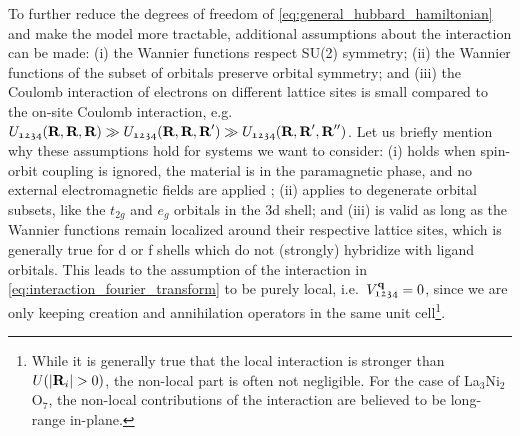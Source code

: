 \documentclass[../../main.tex]{subfiles}
\begin{document}
To further reduce the degrees of freedom of \eqref{eq:general_hubbard_hamiltonian} and make the model more tractable, additional assumptions about the interaction can be made: (i) the Wannier functions respect SU(2) symmetry; (ii) the Wannier functions of the subset of orbitals preserve orbital symmetry; and (iii) the Coulomb interaction of electrons on different lattice sites is small compared to the on-site Coulomb interaction, e.g.\ $U_{\mathfrak{1234}}(\textbf{R},\textbf{R},\textbf{R})\gg U_{\mathfrak{1234}}(\textbf{R},\textbf{R},\textbf{R}')\gg U_{\mathfrak{1234}}(\textbf{R},\textbf{R}',\textbf{R}'')$. Let us briefly mention why these assumptions hold for systems we want to consider: (i) holds when spin-orbit coupling is ignored, the material is in the paramagnetic phase, and no external electromagnetic fields are applied \cite{Georges2013}; (ii) applies to degenerate orbital subsets, like the $t_{2g}$ and $e_g$ orbitals in the 3d shell; and (iii) is valid as long as the Wannier functions remain localized around their respective lattice sites, which is generally true for d or f shells which do not (strongly) hybridize with ligand orbitals. This leads to the assumption of the interaction in \eqref{eq:interaction_fourier_transform} to be purely local, i.e.\ $V^{\textbf{q}}_{\mathfrak{1234}}=0$, since we are only keeping creation and annihilation operators in the same unit cell\footnote{While it is generally true that the local interaction is stronger than $U(|\vv{R}_i|>0)$, the non-local part is often not negligible. For the case of La$_3$Ni$_2$O$_7$, the non-local contributions of the interaction are believed to be long-range in-plane.}.
\end{document}
